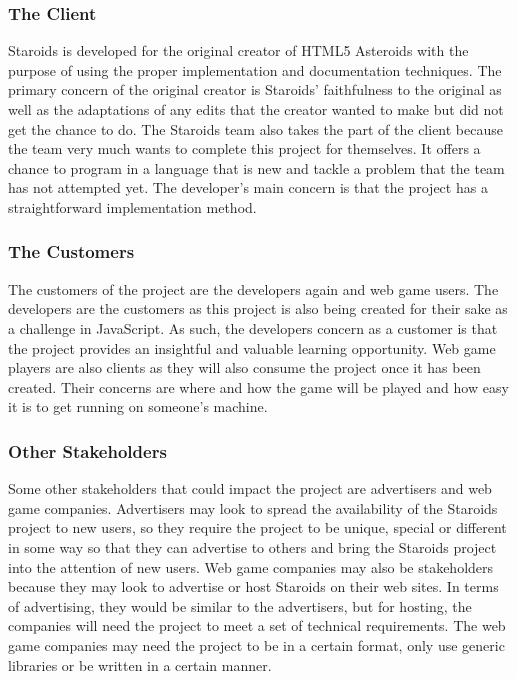 \documentclass[12pt, titlepage]{article}
\begin{document}
\subsubsection{The Client}
Staroids is developed for the original creator of HTML5 Asteroids with the purpose of using the proper implementation and documentation techniques. The primary concern of the original creator is Staroids' faithfulness to the original as well as the adaptations of any edits that the creator wanted to make but did not get the chance to do. The Staroids team also takes the part of the client because the team very much wants to complete this project for themselves. It offers a chance to program in a language that is new and tackle a problem that the team has not attempted yet. The developer's main concern is that the project has a straightforward implementation method.\\

\subsubsection{The Customers}
The customers of the project are the developers again and web game users. The developers are the customers as this project is also being created for their sake as a challenge in JavaScript. As such, the developers concern as a customer is that the project provides an insightful and valuable learning opportunity. Web game players are also clients as they will also consume the project once it has been created. Their concerns are where and how the game will be played and how easy it is to get running on someone's machine.\\

\subsubsection{Other Stakeholders}
Some other stakeholders that could impact the project are advertisers and web game companies. Advertisers may look to spread the availability of the Staroids project to new users, so they require the project to be unique, special or different in some way so that they can advertise to others and bring the Staroids project into the attention of new users. Web game companies may also be stakeholders because they may look to advertise or host Staroids on their web sites. In terms of advertising, they would be similar to the advertisers, but for hosting, the companies will need the project to meet a set of technical requirements. The web game companies may need the project to be in a certain format, only use generic libraries or be written in a certain manner.\\
\end{document}
